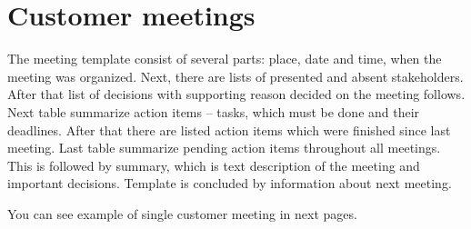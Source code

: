 \chapter{Customer meetings}
The meeting template consist of several parts: place, date and time, when the meeting was organized.
Next, there are lists of presented and absent stakeholders.
After that list of decisions with supporting reason decided on the meeting follows.
Next table summarize action items -- tasks, which must be done and their deadlines.
After that there are listed action items which were finished since last meeting.
Last table summarize pending action items throughout all meetings.
This is followed by summary, which is text description of the meeting and important decisions.
Template is concluded by information about next meeting.

You can see example of single customer meeting in next pages.
